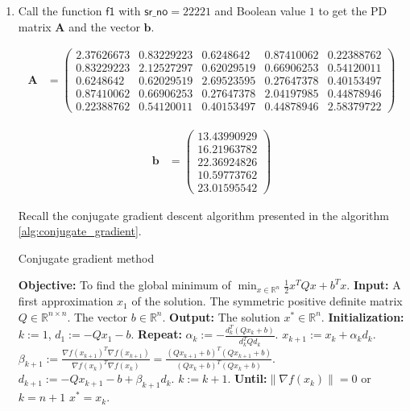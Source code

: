 \documentclass[12pt,a4paper]{article}
\theoremstyle{remark}
\begin{document}
\begin{enumerate}
    \item Call the function $\mathsf{f1}$ with $\mathsf{sr\_no} = 22221$ and Boolean value $1$ to get the PD matrix $\mathbf{A}$ and the vector $\mathbf{b}$.
    
    \begin{align*}
        \mathbf{A} &= \begin{pmatrix}
            2.37626673 & 0.83229223 & 0.6248642 & 0.87410062 & 0.22388762 \\
            0.83229223 & 2.12527297 & 0.62029519 & 0.66906253 & 0.54120011 \\
            0.6248642 & 0.62029519 & 2.69523595 & 0.27647378 & 0.40153497 \\
            0.87410062 & 0.66906253 & 0.27647378 & 2.04197985 & 0.44878946 \\
            0.22388762 & 0.54120011 & 0.40153497 & 0.44878946 & 2.58379722
        \end{pmatrix}
    \end{align*}

    \begin{align*}
        \mathbf{b} &= \begin{pmatrix}
            13.43990929 \\
            16.21963782 \\
            22.36924826 \\
            10.59773762 \\
            23.01595542
        \end{pmatrix}
    \end{align*}

    Recall the conjugate gradient descent algorithm presented in the algorithm \ref{alg:conjugate_gradient}.

    \begin{algorithm}
        \caption{Conjugate gradient method}
        \begin{algorithmic}[1]
        \State \textbf{Objective:}
            \State To find the global minimum of $\min_{x \in \mathbb{R}^n} \frac{1}{2}x^TQx + b^Tx$.
        \State \textbf{Input:}
            \State A first approximation $x_1$ of the solution.
            \State The symmetric positive definite matrix $Q \in \mathbb{R}^{n\times n}$.
            \State The vector $b \in \mathbb{R}^n$.
        \State \textbf{Output:}
            \State The solution $x^* \in \mathbb{R}^n$.
        \State \textbf{Initialization:}
            \State $k := 1$,
            \State $d_1 := -Qx_1 - b$.
        \State \textbf{Repeat:}
            \State $\alpha_k := -\frac{d_k^T(Qx_k + b)}{d_k^TQd_k}$.
            \State $x_{k+1} := x_k + \alpha_k d_k$.
            \State $\beta_{k+1} := \frac{\nabla f(x_{k+1})^T \nabla f(x_{k+1})}{\nabla f(x_k)^T \nabla f(x_k)} = \frac{(Qx_{k+1} + b)^T(Qx_{k+1} + b)}{(Qx_k + b)^T(Qx_k + b)}$.
            \State $d_{k+1} := -Qx_{k+1} - b + \beta_{k+1} d_k$.
            \State $k := k + 1$.
        \State \textbf{Until:}{$\|\nabla f(x_k)\| = 0$ or $k = n + 1$}
        \State $x^* = x_k$.
        \end{algorithmic}
        \label{alg:conjugate_gradient}
    \end{algorithm}


\end{enumerate}
\end{document}
